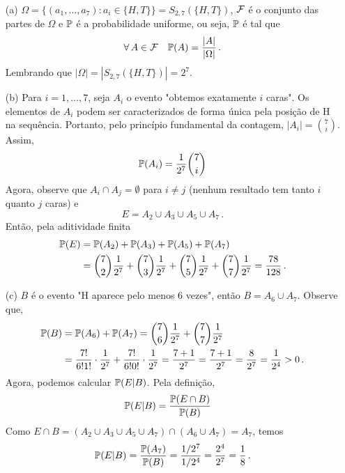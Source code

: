 \begin{solution}
~
\begin{itemize}
\item[(a)] $\Omega = \{(a_1, \dots, a_7): a_i \in \{H, T\}\} = S_{2, 7}(\{H, T\})$,
$\mathcal F$ é o conjunto das partes de $\Omega$ e $\mathbb{P}$ é a probabilidade uniforme, ou seja, $\mathbb{P}$ é tal que 
\begin{equation}
\forall \, A \in \mathcal F \quad \mathbb{P}(A) = \frac{|A|}{|\Omega|}\,.
\end{equation}
Lembrando que $|\Omega| = |S_{2, 7}(\{H, T\})| = 2^7.$ 
\item[(b)] Para $i=1,\dots,7$, seja 
$A_i$ o evento "obtemos exatamente $i$ caras". Os elementos de $A_i$ podem ser caracterizados de forma única pela posição de H na sequência. Portanto, pelo princípio fundamental da contagem, $|A_i| = \binom{7}{i}$. Assim,
\[
\mathbb{P}(A_i) = \frac{1}{2^7} \binom{7}{i}
\] 
Agora, observe que $A_i \cap A_j = \emptyset$ para $i \neq j$ (nenhum resultado tem tanto $i$ quanto $j$ caras) e 
\begin{equation}
E = A_2 \cup A_3 \cup A_5 \cup A_7 \,.
\end{equation}
Então, pela aditividade finita 
\begin{align}
\mathbb{P}(E) &= \mathbb{P}(A_2)+\mathbb{P}(A_3)+\mathbb{P}(A_5)+\mathbb{P}(A_7) \\
&= \binom{7}{2} \frac{1}{2^7} + \binom{7}{3} \frac{1}{2^7}
+ \binom{7}{5} \frac{1}{2^7} +\binom{7}{7} \frac{1}{2^7} = \frac{78}{128}\,.
\end{align}
\item[(c)] $B$ é o evento "H aparece pelo menos 6 vezes", então $B=A_6\cup A_7$. Observe que, 
\begin{align}
\mathbb{P}(B) &= \mathbb{P}(A_6)+\mathbb{P}(A_7) = \binom{7}{6} \frac{1}{2^7} + \binom{7}{7} \frac{1}{2^7} \\
&= \frac{7!}{6!1!} \cdot \frac{1}{2^7} + \frac{7!}{6!0!} \cdot \frac{1}{2^7}
= \frac{7+1}{2^7} = \frac{7+1}{2^7} =\frac{8}{2^7}= \frac{1}{2^4} >0 \,.
\end{align}
Agora, podemos calcular $\mathbb{P}(E|B)$. Pela definição,
\begin{align}
\mathbb{P}(E|B) &= \frac{\mathbb{P}(E \cap B)}{\mathbb{P}(B)} 
\end{align}
Como $E \cap B = (A_2 \cup A_3 \cup A_5 \cup A_7) \cap (A_6 \cup A_7) = A_7$, temos 
\[
 \mathbb{P}(E|B) = \frac{\mathbb{P}(A_7)}{\mathbb{P}(B)} = \frac{1/2^7}{1/2^4} = \frac{2^4}{2^7} = \frac{1}{8} \,.
\]
\end{itemize}
\end{solution}

